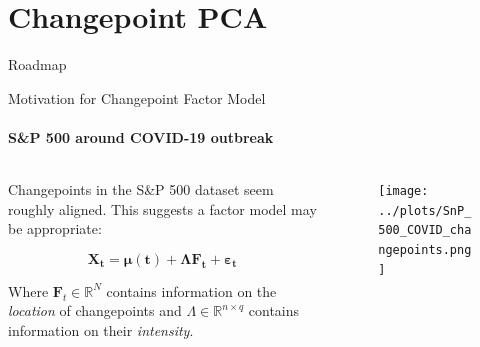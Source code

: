 \documentclass{beamer}
\begin{document}

\section{Changepoint PCA}




\begin{frame}{Roadmap}
\tableofcontents[currentsection]
\end{frame}




\begin{frame}{Motivation for Changepoint Factor Model}
\framesubtitle{S\&P 500 around COVID-19 outbreak}


\begin{columns}

    \begin{column}{0.5\textwidth}
	
	Changepoints in the S\&P 500 dataset seem roughly aligned. This suggests a factor model may be appropriate:
	
	\begin{equation*}
		\boldsymbol{X_t = \boldsymbol{\mu \left ( t \right )} + \Lambda F_t + \varepsilon_t}
	\end{equation*}		
	
	\bigskip	
	
	Where $\boldsymbol{F}_t \in \mathbb{R}^{N}$ contains information on the \textit{location} of changepoints and $\Lambda \in \mathbb{R}^{n \times q}$ contains information on their \textit{intensity}.
	
    \end{column}
    
    \begin{column}{0.5\textwidth}
		\begin{figure}
    			\centering
    			\texttt{[image: ../plots/SnP\_500\_COVID\_changepoints.png]}
		\end{figure}
    \end{column}
    
\end{columns}

\end{frame}



\end{document}
